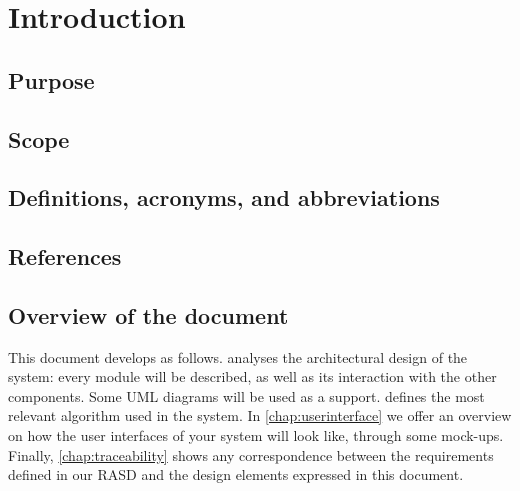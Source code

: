 \chapter{Introduction} \label{chap:introduction}


\section{Purpose}
\lipsum[1]


\section{Scope}
\lipsum[2]


\section{Definitions, acronyms, and abbreviations}
\lipsum[3]

\section{References}
\lipsum[4]


\section{Overview of the document}	
This document develops as follows.  analyses the architectural design of the system: every module will be described, as well as its interaction with the other components. Some UML diagrams will be used as a support.  defines the most relevant algorithm used in the system. In \cref{chap:userinterface} we offer an overview on how the user interfaces of your system will look like, through some mock-ups. Finally, \cref{chap:traceability} shows any correspondence between the requirements defined in our RASD and the design elements expressed in this document.

